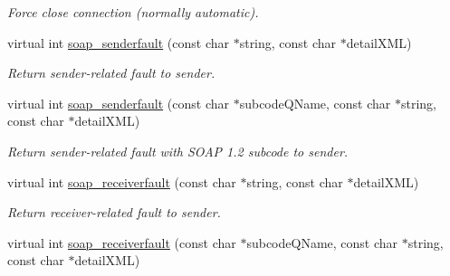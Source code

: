 \begin{DoxyCompactItemize}
\begin{DoxyCompactList}\small\item\em Force close connection (normally automatic). \item\end{DoxyCompactList}\item 
\hypertarget{classPASSPortBindingService_a9b51ac2e0331afc794b18113de22145b}{
virtual int \hyperlink{classPASSPortBindingService_a9b51ac2e0331afc794b18113de22145b}{soap\_\-senderfault} (const char $\ast$string, const char $\ast$detailXML)}
\label{classPASSPortBindingService_a9b51ac2e0331afc794b18113de22145b}

\begin{DoxyCompactList}\small\item\em Return sender-\/related fault to sender. \item\end{DoxyCompactList}\item 
\hypertarget{classPASSPortBindingService_a560d68df9ce0fbb281a2d8a68163a904}{
virtual int \hyperlink{classPASSPortBindingService_a560d68df9ce0fbb281a2d8a68163a904}{soap\_\-senderfault} (const char $\ast$subcodeQName, const char $\ast$string, const char $\ast$detailXML)}
\label{classPASSPortBindingService_a560d68df9ce0fbb281a2d8a68163a904}

\begin{DoxyCompactList}\small\item\em Return sender-\/related fault with SOAP 1.2 subcode to sender. \item\end{DoxyCompactList}\item 
\hypertarget{classPASSPortBindingService_a2660936527bf44e8f49e892bbbf7cd9c}{
virtual int \hyperlink{classPASSPortBindingService_a2660936527bf44e8f49e892bbbf7cd9c}{soap\_\-receiverfault} (const char $\ast$string, const char $\ast$detailXML)}
\label{classPASSPortBindingService_a2660936527bf44e8f49e892bbbf7cd9c}

\begin{DoxyCompactList}\small\item\em Return receiver-\/related fault to sender. \item\end{DoxyCompactList}\item 
\hypertarget{classPASSPortBindingService_a616116b39000162e13b74cb2df1ea0b1}{
virtual int \hyperlink{classPASSPortBindingService_a616116b39000162e13b74cb2df1ea0b1}{soap\_\-receiverfault} (const char $\ast$subcodeQName, const char $\ast$string, const char $\ast$detailXML)}
\label{classPASSPortBindingService_a616116b39000162e13b74cb2df1ea0b1}


\end{DoxyCompactItemize}
